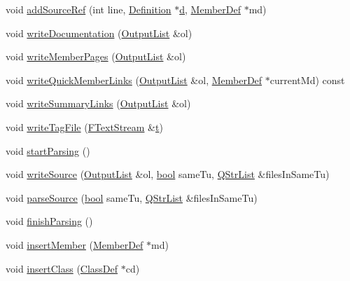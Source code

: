 \begin{DoxyCompactItemize}
\item 
void \hyperlink{class_file_def_ab77cd017d7354f3bed14a639ac7cda39}{add\+Source\+Ref} (int line, \hyperlink{class_definition}{Definition} $\ast$\hyperlink{060__command__switch_8tcl_af43f4b1f0064a33b2d662af9f06d3a00}{d}, \hyperlink{class_member_def}{Member\+Def} $\ast$md)
\item 
void \hyperlink{class_file_def_a7a73cf8448a6995be00369858d4768e8}{write\+Documentation} (\hyperlink{class_output_list}{Output\+List} \&ol)
\item 
void \hyperlink{class_file_def_a8df204556e3773738f133314d8bc2fbb}{write\+Member\+Pages} (\hyperlink{class_output_list}{Output\+List} \&ol)
\item 
void \hyperlink{class_file_def_a2bbd376679e5b77263424269ca877626}{write\+Quick\+Member\+Links} (\hyperlink{class_output_list}{Output\+List} \&ol, \hyperlink{class_member_def}{Member\+Def} $\ast$current\+Md) const 
\item 
void \hyperlink{class_file_def_a077e73e869533220c7a94276c40359ef}{write\+Summary\+Links} (\hyperlink{class_output_list}{Output\+List} \&ol)
\item 
void \hyperlink{class_file_def_a9107fa6f9cbf264e8632e235892278ae}{write\+Tag\+File} (\hyperlink{class_f_text_stream}{F\+Text\+Stream} \&\hyperlink{058__bracket__recursion_8tcl_a69e959f6901827e4d8271aeaa5fba0fc}{t})
\item 
void \hyperlink{class_file_def_a378a97570f1ac9a9795ec5700ab4ed97}{start\+Parsing} ()
\item 
void \hyperlink{class_file_def_a5ed9987b075539aa61654cc55d3bac28}{write\+Source} (\hyperlink{class_output_list}{Output\+List} \&ol, \hyperlink{qglobal_8h_a1062901a7428fdd9c7f180f5e01ea056}{bool} same\+Tu, \hyperlink{class_q_str_list}{Q\+Str\+List} \&files\+In\+Same\+Tu)
\item 
void \hyperlink{class_file_def_a05dd5f93ab3877d299b22727a454199e}{parse\+Source} (\hyperlink{qglobal_8h_a1062901a7428fdd9c7f180f5e01ea056}{bool} same\+Tu, \hyperlink{class_q_str_list}{Q\+Str\+List} \&files\+In\+Same\+Tu)
\item 
void \hyperlink{class_file_def_a1b008bcc891525a7b00888511f89101a}{finish\+Parsing} ()
\item 
void \hyperlink{class_file_def_a84f7bb05a4a830056b208d94c6c2bd59}{insert\+Member} (\hyperlink{class_member_def}{Member\+Def} $\ast$md)
\item 
void \hyperlink{class_file_def_a61ec1208cd1055a3d91cb6a2ee60451d}{insert\+Class} (\hyperlink{class_class_def}{Class\+Def} $\ast$cd)

\end{DoxyCompactItemize}
